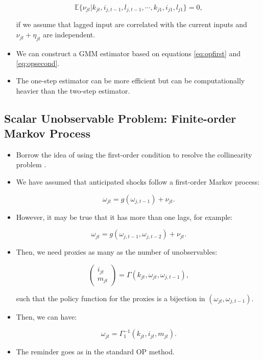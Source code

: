 \documentclass[]{book}
\providecommand{\tightlist}{%
  \setlength{\itemsep}{0pt}\setlength{\parskip}{0pt}}
\theoremstyle{definition}
\theoremstyle{definition}
\theoremstyle{definition}
\theoremstyle{remark}
\begin{document}
\begin{itemize}
  \begin{equation}
  \mathbb{E}\{\nu_{jt}|k_{jt}, i_{j, t - 1}, l_{j, t - 1}, \cdots, k_{j1}, i_{j1}, l_{j1}\} = 0,
  \end{equation}

  if we assume that lagged input are correlated with the current inputs
  and \(\nu_{jt} + \eta_{jt}\) are independent.
\item
  We can construct a GMM estimator based on equations \eqref{eq:opfirst}
  and \eqref{eq:opsecond}.
\item
  The one-step estimator can be more efficient but can be
  computationally heavier than the two-step estimator.
\end{itemize}

\subsection{Scalar Unobservable Problem: Finite-order Markov
Process}\label{scalar-unobservable-problem-finite-order-markov-process}

\begin{itemize}
\tightlist
\item
  Borrow the idea of using the first-order condition to resolve the
  collinearity problem \citep{Gandhi2017a}.
\item
  We have assumed that anticipated shocks follow a first-order Markov
  process:

  \begin{equation}
  \omega_{jt} = g(\omega_{j, t - 1}) + \nu_{jt}.
  \end{equation}
\item
  However, it may be true that it has more than one lags, for example:

  \begin{equation}
  \omega_{jt} = g(\omega_{j, t - 1}, \omega_{j, t - 2}) + \nu_{jt}.
  \end{equation}
\item
  Then, we need proxies as many as the number of unobservables:

  \begin{equation}
  \begin{pmatrix}
  i_{jt} \\ m_{jt} 
  \end{pmatrix}
  = \Gamma(k_{jt}, \omega_{jt}, \omega_{j, t - 1}),
  \end{equation}

  such that the policy function for the proxies is a bijection in
  \((\omega_{jt}, \omega_{j, t - 1})\).
\item
  Then, we can have:

  \begin{equation}
  \omega_{jt} = \Gamma_1^{-1}(k_{jt}, i_{jt}, m_{jt}).
  \end{equation}
\item
  The reminder goes as in the standard OP method.
\end{itemize}
\end{document}
